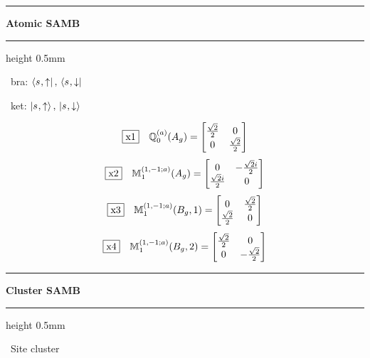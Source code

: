 \documentclass[fleqn,10pt,landscape]{jsarticle}
\begin{document}
\vspace{5mm}
\noindent \rule[0.5mm]{5mm}{0.5mm}\hspace{3mm}\textbf{Atomic SAMB}\hspace{3mm}\leaders\hrule height 0.5mm\hfill\kern0pt
\vspace{3mm}

\vspace{5mm}

\noindent\textbullet\, bra: $\bra{s_{},\uparrow},\, \bra{s_{},\downarrow}$

\noindent\textbullet\, ket: $\ket{s_{},\uparrow},\, \ket{s_{},\downarrow}$

\begin{dmath*}
\fbox{x1}\quad \mathbb{Q}_{0}^{(a)}(A_{g})=\begin{bmatrix} \frac{\sqrt{2}}{2} & 0 \\ 0 & \frac{\sqrt{2}}{2} \end{bmatrix}
\end{dmath*}
\begin{dmath*}
\fbox{x2}\quad \mathbb{M}_{1}^{(1,-1;a)}(A_{g})=\begin{bmatrix} 0 & - \frac{\sqrt{2} i}{2} \\ \frac{\sqrt{2} i}{2} & 0 \end{bmatrix}
\end{dmath*}
\begin{dmath*}
\fbox{x3}\quad \mathbb{M}_{1}^{(1,-1;a)}(B_{g},1)=\begin{bmatrix} 0 & \frac{\sqrt{2}}{2} \\ \frac{\sqrt{2}}{2} & 0 \end{bmatrix}
\end{dmath*}
\begin{dmath*}
\fbox{x4}\quad \mathbb{M}_{1}^{(1,-1;a)}(B_{g},2)=\begin{bmatrix} \frac{\sqrt{2}}{2} & 0 \\ 0 & - \frac{\sqrt{2}}{2} \end{bmatrix}
\end{dmath*}
\vspace{5mm}
\noindent \rule[0.5mm]{5mm}{0.5mm}\hspace{3mm}\textbf{Cluster SAMB}\hspace{3mm}\leaders\hrule height 0.5mm\hfill\kern0pt
\vspace{3mm}

\noindent\textbullet\, Site cluster

\vspace{5mm}
\end{document}
